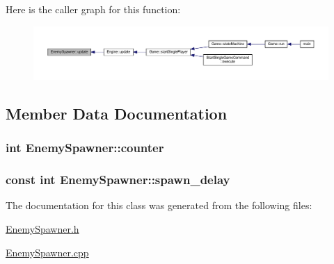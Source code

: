 Here is the caller graph for this function\+:
\nopagebreak
\begin{figure}[H]
\begin{center}
\leavevmode
\includegraphics[width=350pt]{class_enemy_spawner_a1b00731679380c088027072b11583d6c_icgraph}
\end{center}
\end{figure}




\subsection{Member Data Documentation}
\hypertarget{class_enemy_spawner_a10072a5aab9a1d055df222ee0ef3fe6e}{}
\subsubsection[{counter}]{\setlength{\rightskip}{0pt plus 5cm}int Enemy\+Spawner\+::counter}\label{class_enemy_spawner_a10072a5aab9a1d055df222ee0ef3fe6e}
\hypertarget{class_enemy_spawner_a925cbf3cbaadaf7b376ef6aadc955d7f}{}
\subsubsection[{spawn\+\_\+delay}]{\setlength{\rightskip}{0pt plus 5cm}const int Enemy\+Spawner\+::spawn\+\_\+delay}\label{class_enemy_spawner_a925cbf3cbaadaf7b376ef6aadc955d7f}


The documentation for this class was generated from the following files\+:\begin{DoxyCompactItemize}
\item 
\hyperlink{_enemy_spawner_8h}{Enemy\+Spawner.\+h}\item 
\hyperlink{_enemy_spawner_8cpp}{Enemy\+Spawner.\+cpp}\end{DoxyCompactItemize}
